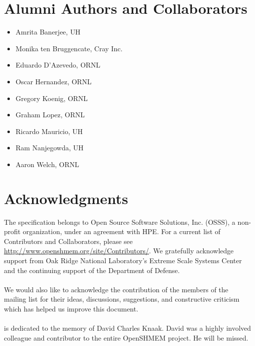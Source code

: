 \section*{Alumni Authors and Collaborators}
\begin{itemize}
\item Amrita Banerjee, \ac{UH}
\item Monika ten Bruggencate, Cray Inc.
\item Eduardo D'Azevedo, \ac{ORNL}
\item Oscar Hernandez, \ac{ORNL}
\item Gregory Koenig, \ac{ORNL}
\item Graham Lopez, \ac{ORNL}
\item Ricardo Mauricio, \ac{UH}
\item Ram Nanjegowda, \ac{UH}
\item Aaron Welch, \ac{ORNL}

\end{itemize}

\date{\today}

\section*{Acknowledgments}
The \openshmem specification belongs to Open Source Software Solutions, Inc.
(OSSS), a non-profit organization, under an agreement with HPE. For a current list
of Contributors and Collaborators, please see
  \url{http://www.openshmem.org/site/Contributors/}.
We gratefully acknowledge support from
Oak Ridge National Laboratory's
Extreme Scale Systems Center and the continuing support of the Department of Defense.\\
\\
We would also like to acknowledge the contribution of the members of the
\openshmem mailing list for their ideas, discussions, suggestions, and
constructive criticism which has helped us improve this document.\\
\\
\openshmem[1.4] is dedicated to the memory of David Charles Knaak. David was a highly involved
colleague and contributor to the entire OpenSHMEM project. He will be missed.
